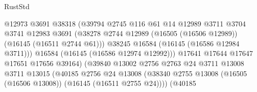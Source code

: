 \begin{lexlean}{RustStd}
\begin{coremodule}
                                            @12973
                                            @3691
                                            @38318
                                            (@39794
                                              @2745
                                              @116
                                              @61
                                              @14
                                              @12989
                                              @3711
                                              @3704
                                              @3741
                                              @12983
                                              @3691
                                              (@38278
                                                @2744
                                                @12989
                                                (@16505 (@16506 @12989))
                                                (@16145 (@16511 @2744 @61)))
                                              @38245
                                              @16584
                                              (@16145 (@16586 @12984 @3711)))
                                            @16584
                                            (@16145 (@16586 @12974 @12992)))
                                          @17641
                                          @17644
                                          @17647
                                          @17651
                                          @17656
                                          @39164)
                                        (@39840
                                          @13002
                                          @2756
                                          @2763
                                          @24
                                          @3711
                                          @13008
                                          @3711
                                          @13015
                                          (@40185
                                            @2756
                                            @24
                                            @13008
                                            (@38340
                                              @2755
                                              @13008
                                              (@16505 (@16506 @13008))
                                              (@16145 (@16511 @2755 @24))))
                                          (@40185

\end{coremodule}
\end{lexlean}
